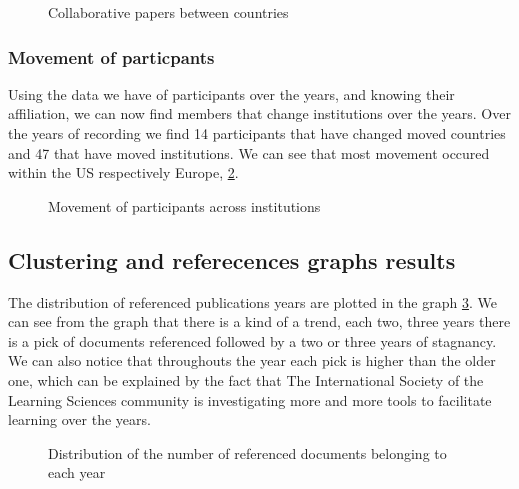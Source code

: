 \documentclass[article,twocolumn]{IEEEtran}
\begin{document}
    \begin{figure}
        \begin{center}\end{center}
        \caption{Collaborative papers between countries}
        \label{figcollab}
    \end{figure}
    
    \hypertarget{movement-of-particpants}{%
\subsubsection{Movement of particpants}\label{movement-of-particpants}}

Using the data we have of participants over the years, and knowing their
affiliation, we can now find members that change institutions over the
years. Over the years of recording we find 14 participants that have
changed moved countries and 47 that have moved institutions. We can see
that most movement occured within the US respectively Europe,
\ref{fig_move}.


    \begin{figure}
        \begin{center}\end{center}
        \caption{Movement of participants across institutions}
        \label{fig_move}
    \end{figure}
    
    \hypertarget{clustering-and-referecences-graphs-results}{%
\subsection{Clustering and referecences graphs
results}\label{clustering-and-referecences-graphs-results}}

The distribution of referenced publications years are plotted in the
graph \ref{count_ref_docs}. We can see from the graph that there is a
kind of a trend, each two, three years there is a pick of documents
referenced followed by a two or three years of stagnancy. We can also
notice that throughouts the year each pick is higher than the older one,
which can be explained by the fact that The International Society of the
Learning Sciences community is investigating more and more tools to
facilitate learning over the years.


    \begin{figure}
        \begin{center}\end{center}
        \caption{Distribution of the number of referenced documents belonging to each year}
        \label{count_ref_docs}
    \end{figure}
    
\end{document}
